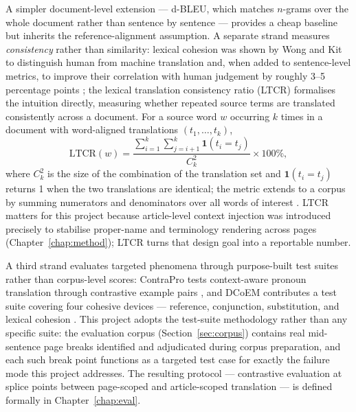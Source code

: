 A simpler document-level extension --- d-BLEU, which matches
$n$-grams over the whole document rather than sentence by sentence
\cite{liu2020mbart} --- provides a cheap baseline but inherits the
reference-alignment assumption.
A separate strand measures \emph{consistency} rather than similarity:
lexical cohesion was shown by Wong and Kit to distinguish human from
machine translation and, when added to sentence-level metrics, to
improve their correlation with human judgement by roughly 3--5
percentage points \cite{wong2012cohesion}; the lexical translation
consistency ratio (LTCR) \cite{lyu2021ltcr} formalises the intuition
directly, measuring whether repeated source terms are translated
consistently across a document. For a source word $w$ occurring $k$
times in a document with word-aligned translations $(t_1,\dots,t_k)$,
\begin{equation}
\mathrm{LTCR}(w) =
\frac{\sum_{i=1}^{k}\sum_{j=i+1}^{k} \mathbf{1}\!\left(t_i = t_j\right)}
     {C_k^2} \times 100\%,
\label{eq:ltcr}
\end{equation}
where $C_k^2$ is the size of the combination of the translation set and
$\mathbf{1}(t_i = t_j)$ returns 1 when the two translations are
identical; the metric extends to a corpus by summing numerators and
denominators over all words of interest \cite{lyu2021ltcr}.
LTCR matters for this project because article-level context injection
was introduced precisely to stabilise proper-name and terminology
rendering across pages (Chapter~\ref{chap:method}); LTCR turns that
design goal into a reportable number.

A third strand evaluates targeted phenomena through purpose-built test
suites rather than corpus-level scores: ContraPro tests context-aware
pronoun translation through contrastive example pairs
\cite{mueller2018contrapro}, and DCoEM contributes a test suite
covering four cohesive devices --- reference, conjunction,
substitution, and lexical cohesion \cite{tan2022dcoem}. This project
adopts the test-suite methodology rather than any specific suite: the
evaluation corpus (Section~\ref{sec:corpus}) contains real mid-sentence
page breaks identified and adjudicated during corpus preparation, and
each such break point functions as a targeted test case for exactly the
failure mode this project addresses. The resulting protocol ---
contrastive evaluation at splice points between page-scoped and
article-scoped translation --- is defined formally in
Chapter~\ref{chap:eval}.

